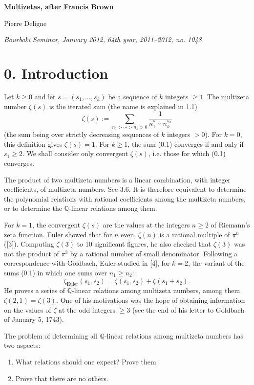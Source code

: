 \documentclass[10pt]{article}
\newcommand{\Q}{\mathbb Q}
\begin{document}
\begin{center}
{\Large\bfseries Multizetas, after Francis Brown}\par
\vspace{0.4em}
Pierre Deligne\par
\vspace{0.4em}
{\itshape Bourbaki Seminar, January 2012, 64th year, 2011--2012, no. 1048}
\end{center}

\section*{0. Introduction}

Let $k\geq 0$ and let $s=(s_1,\ldots,s_k)$ be a sequence of $k$ integers $\geq 1$.
The multizeta number $\zeta(s)$ is the iterated sum (the name is explained in 1.1)
\begin{equation}
\zeta(s):=\sum_{n_1>\cdots>n_k>0}\frac{1}{n_1^{s_1}\cdots n_k^{s_k}}
\tag{0.1}
\end{equation}
(the sum being over strictly decreasing sequences of $k$ integers $>0$).
For $k=0$, this definition gives $\zeta(s)=1$.
For $k\geq 1$, the sum (0.1) converges if and only if $s_1\geq 2$.
We shall consider only convergent $\zeta(s)$, i.e. those for which (0.1) converges.

The product of two multizeta numbers is a linear combination, with integer coefficients, of multizeta numbers. See 3.6.
It is therefore equivalent to determine the polynomial relations with rational coefficients among the multizeta numbers, or to determine the $\Q$-linear relations among them.

For $k=1$, the convergent $\zeta(s)$ are the values at the integers $n\geq 2$ of Riemann's zeta function.
Euler showed that for $n$ even, $\zeta(n)$ is a rational multiple of $\pi^n$ ([3]).
Computing $\zeta(3)$ to 10 significant figures, he also checked that $\zeta(3)$ was not the product of $\pi^3$ by a rational number of small denominator.
Following a correspondence with Goldbach, Euler studied in [4], for $k=2$, the variant of the sums (0.1) in which one sums over $n_1\geq n_2$:
\[
 \zeta_{\mathrm{Euler}}(s_1,s_2)=\zeta(s_1,s_2)+\zeta(s_1+s_2).
\]
He proves a series of $\Q$-linear relations among multizeta numbers, among them $\zeta(2,1)=\zeta(3)$.
One of his motivations was the hope of obtaining information on the values of $\zeta$ at the odd integers $\geq 3$ (see the end of his letter to Goldbach of January 5, 1743).

The problem of determining all $\Q$-linear relations among multizeta numbers has two aspects:
\begin{enumerate}[label=(\Alph*)]
\item What relations should one expect? Prove them.
\item Prove that there are no others.
\end{enumerate}
\end{document}
